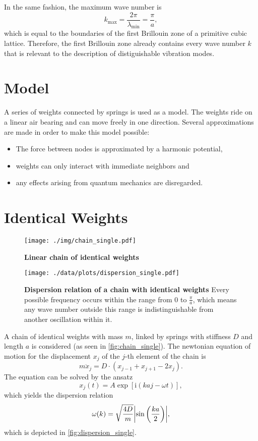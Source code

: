 In the same fashion, the maximum wave number is
\begin{equation*}
	k_\text{max}=\frac{2\pi}{\lambda_\text{min}}=\frac{\pi}{a},
\end{equation*}
which is equal to the boundaries of the first Brillouin zone of a primitive cubic lattice.
Therefore, the first Brillouin zone already contains every wave number $k$ that is relevant to the description of distiguishable vibration modes.

\section{Model}
A series of weights connected by springs is used as a model.
The weights ride on a linear air bearing and can move freely in one direction.
Several approximations are made in order to make this model possible:
\begin{itemize}
	\item The force between nodes is approximated by a harmonic potential,
	\item weights can only interact with immediate neighbors and
	\item any effects arising from quantum mechanics are disregarded.
\end{itemize}

\section{Identical Weights}
\begin{figure}[tbp]
	\centering
	\texttt{[image: ./img/chain\_single.pdf]}
	\caption[Chain of Identical Weights]{\textbf{Linear chain of identical weights}}
	\label{fig:chain_single}
\end{figure}
\begin{figure}[tbp]
	\centering
	\texttt{[image: ./data/plots/dispersion\_single.pdf]}
	\caption[Dispersion Relation of Chain With Identical Weights]{\textbf{Dispersion relation of a chain with identical weights} Every possible frequency occurs within the range from 0 to $\frac{\pi}{a}$, which means any wave number outside this range is indistinguishable from another oscillation within it.}
	\label{fig:dispersion_single}
\end{figure}
A chain of identical weights with mass $m$, linked by springs with stiffness $D$ and length $a$ is considered (as seen in \autoref{fig:chain_single}).
The newtonian equation of motion for the displacement $x_j$ of the $j$-th element of the chain is
\begin{equation*}
	m \ddot x_j = D \cdot \left(x_{j - 1} + x_{j + 1} - 2 x_j \right).
\end{equation*}
The equation can be solved by the ansatz
\begin{equation*}
	x_j(t) = A \exp\left[\text{i} \left(k a j - \omega t\right)\right],
\end{equation*}
which yields the dispersion relation
\begin{equation}
	\omega(k) = \sqrt{\frac{4D}{m}}\abs{\sin\left(\frac{ka}{2}\right)},
\end{equation}
which is depicted in \autoref{fig:dispersion_single}.

